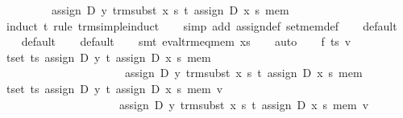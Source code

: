 \begin{isabellebody}
\ \ \ \ \ \ \ \ \ assign\ D\ y\ {}trm{}subst\ x\ s\ t{}\ {}assign\ D\ x\ s\ mem{}{}\isanewline
%
\isadelimproof
\ \ %
\endisadelimproof
%
\isatagproof
{}\isamarkupfalse%
\ {}induct\ t\ rule{}\ trm{}simple{}induct{}\isanewline
\ \ \isamarkupfalse%
\ {}simp\ add{}\ assign{}def\ set{}mem{}def{}\isanewline
\ \ \isamarkupfalse%
\ default\isanewline
\ \ \isamarkupfalse%
\ default\isanewline
\ \ \isamarkupfalse%
\ default\isanewline
\ \ \isamarkupfalse%
\ {}smt\ eval{}trm{}eq{}mem\ xs{}\isanewline
\ \ \isamarkupfalse%
\ auto\isanewline
{}\isamarkupfalse%
\isanewline
\ \ \isamarkupfalse%
\ f\ ts\ v\isanewline
\ \ \isamarkupfalse%
\ {}{}t{}set\ ts{}\ assign\ D\ y\ t\ {}assign\ D\ x\ s\ mem{}\ {}\isanewline
\ \ \ \ \ \ \ \ \ \ \ \ \ \ \ \ \ \ \ \ \ \ assign\ D\ y\ {}trm{}subst\ x\ s\ t{}\ {}assign\ D\ x\ s\ mem{}{}\isanewline
\ \ \isamarkupfalse%
\ {}{}t{}set\ ts{}\ assign\ D\ y\ t\ {}assign\ D\ x\ s\ mem{}\ v\ {}\isanewline
\ \ \ \ \ \ \ \ \ \ \ \ \ \ \ \ \ \ \ \ \ assign\ D\ y\ {}trm{}subst\ x\ s\ t{}\ {}assign\ D\ x\ s\ mem{}\ v{}\isanewline

\end{isabellebody}

